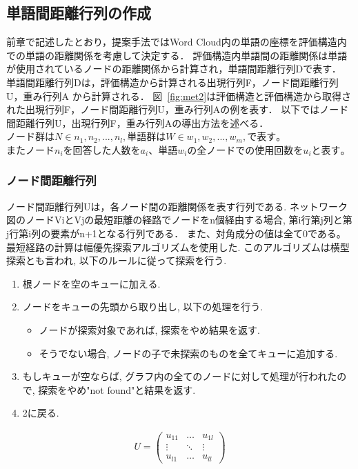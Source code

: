 \documentclass[syuuron]{kuee}
\begin{document}
		\subsection{単語間距離行列の作成}
			前章で記述したとおり，提案手法ではWord Cloud内の単語の座標を評価構造内での単語の距離関係を考慮して決定する．
			評価構造内単語間の距離関係は単語が使用されているノードの距離関係から計算され，単語間距離行列Dで表す．
			単語間距離行列Dは，評価構造から計算される出現行列F，ノード間距離行列U，重み行列A から計算される．
			図~\ref{fig:met2}は評価構造と評価構造から取得された出現行列F，ノード間距離行列U，重み行列Aの例を表す．
			以下ではノード間距離行列U，出現行列F，重み行列Aの導出方法を述べる．
			$ノード群はN \in {n_{1}, n_{2}, ..., n_{l}}, 単語群はW \in {w_{1}, w_{2}, ..., w_{m}}, で表す。$
			$またノードn_iを回答した人数をa_i、単語w_iの全ノードでの使用回数をu_iと表す。$
			
			\subsubsection{ノード間距離行列}
				ノード間距離行列Uは，各ノード間の距離関係を表す行列である. 
				ネットワーク図のノードViとVjの最短距離の経路でノードをn個経由する場合, 
				第i行第j列と第j行第i列の要素がn+1となる行列である．
				また、対角成分の値は全て0である。
				最短経路の計算は幅優先探索アルゴリズムを使用した. 
				このアルゴリズムは横型探索とも言われ, 以下のルールに従って探索を行う. 
				
				\begin{enumerate}
					\item 根ノードを空のキューに加える. 
					\item ノードをキューの先頭から取り出し, 以下の処理を行う. 
						\begin{itemize}
							\item ノードが探索対象であれば, 探索をやめ結果を返す. 
							\item そうでない場合, ノードの子で未探索のものを全てキューに追加する. 
						\end{itemize}
					\item もしキューが空ならば, グラフ内の全てのノードに対して処理が行われたので, 探索をやめ"not found"と結果を返す. 
					\item 2に戻る. 
				\end{enumerate}
				
				\begin{eqnarray}
				 U = \left(
				    \begin{array}{cccc}
				    	u_{11} & \ldots & u_{1l} \\
				    	\vdots & \ddots & \vdots \\
				    	u_{l1} & \ldots & u_{ll}
					\end{array}
				 \right)
				\end{eqnarray}	
		
\end{document}
